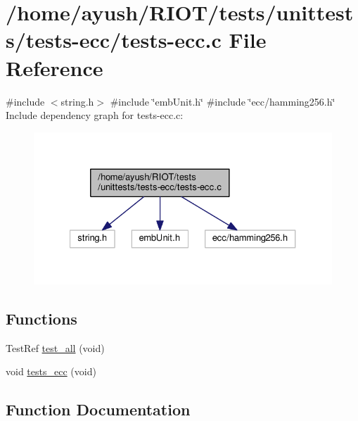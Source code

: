 \hypertarget{tests-ecc_8c}{}\section{/home/ayush/\+R\+I\+O\+T/tests/unittests/tests-\/ecc/tests-\/ecc.c File Reference}
\label{tests-ecc_8c}
{\ttfamily \#include $<$string.\+h$>$}\newline
{\ttfamily \#include \char`\"{}emb\+Unit.\+h\char`\"{}}\newline
{\ttfamily \#include \char`\"{}ecc/hamming256.\+h\char`\"{}}\newline
Include dependency graph for tests-\/ecc.c\+:
\nopagebreak
\begin{figure}[H]
\begin{center}
\leavevmode
\includegraphics[width=327pt]{tests-ecc_8c__incl}
\end{center}
\end{figure}
\subsection*{Functions}
\textbf{ }\par
\begin{DoxyCompactItemize}
\item 
Test\+Ref \hyperlink{tests-ecc_8c_aae4be52b6ff9212dfcbb25f4b637020d}{test\+\_\+all} (void)
\item 
void \hyperlink{tests-ecc_8c_a6d49a5eef05a40d3deb7c268624eb589}{tests\+\_\+ecc} (void)
\end{DoxyCompactItemize}



\subsection{Function Documentation}
\mbox{\label{tests-ecc_8c_aae4be52b6ff9212dfcbb25f4b637020d}} 
